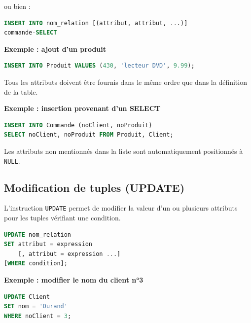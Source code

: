 ou bien :

\begin{sqlcodebox}
\begin{lstlisting}[language=SQL]
INSERT INTO nom_relation [(attribut, attribut, ...)]
commande-SELECT
\end{lstlisting}
\end{sqlcodebox}

\textbf{Exemple : ajout d'un produit}

\begin{sqlcodebox}
\begin{lstlisting}[language=SQL]
INSERT INTO Produit VALUES (430, 'lecteur DVD', 9.99);
\end{lstlisting}
\end{sqlcodebox}

Tous les attributs doivent être fournis dans le même ordre que dans la définition
de la table.

\textbf{Exemple : insertion provenant d’un SELECT}

\begin{sqlcodebox}
\begin{lstlisting}[language=SQL]
INSERT INTO Commande (noClient, noProduit)
SELECT noClient, noProduit FROM Produit, Client;
\end{lstlisting}
\end{sqlcodebox}

Les attributs non mentionnés dans la liste sont automatiquement positionnés à
\texttt{NULL}.

\subsection{Modification de tuples (UPDATE)}

L’instruction \texttt{UPDATE} permet de modifier la valeur d’un ou plusieurs attributs
pour les tuples vérifiant une condition.

\begin{sqlcodebox}
\begin{lstlisting}[language=SQL]
UPDATE nom_relation
SET attribut = expression
    [, attribut = expression ...]
[WHERE condition];
\end{lstlisting}
\end{sqlcodebox}

\textbf{Exemple : modifier le nom du client n°3}

\begin{sqlcodebox}
\begin{lstlisting}[language=SQL]
UPDATE Client
SET nom = 'Durand'
WHERE noClient = 3;
\end{lstlisting}
\end{sqlcodebox}

